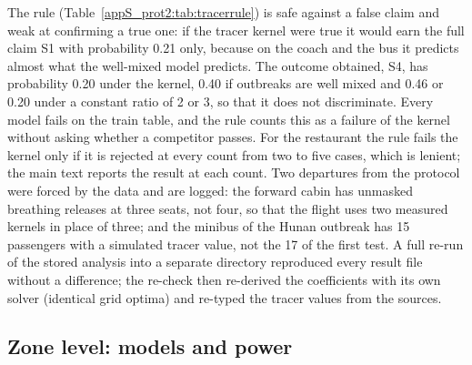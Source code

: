 The rule (Table~\ref{appS_prot2:tab:tracerrule}) is safe against a false claim and weak at confirming a true
one: if the tracer kernel were true it would earn the full claim S1 with probability 0.21 only, because on the
coach and the bus it predicts almost what the well-mixed model predicts. The outcome obtained, S4, has
probability 0.20 under the kernel, 0.40 if outbreaks are well mixed and 0.46 or 0.20 under a constant ratio of
2 or 3, so that it does not discriminate. Every model fails on the train table, and the rule counts this as a
failure of the kernel without asking whether a competitor passes. For the restaurant the rule fails the kernel
only if it is rejected at every count from two to five cases, which is lenient; the main text reports the
result at each count.
Two departures from the protocol were forced by the data and are logged: the forward cabin has unmasked
breathing releases at three seats, not four, so that the flight uses two measured kernels in place of three;
and the minibus of the Hunan outbreak has 15 passengers with a simulated tracer value, not the 17 of the first
test. A full re-run of the stored analysis into a separate directory
reproduced every result file without a difference; the re-check then re-derived the coefficients
with its own solver (identical grid optima) and re-typed the tracer values from the sources.

\subsection{Zone level: models and power}\label{appS_prot2:sec:zones}


